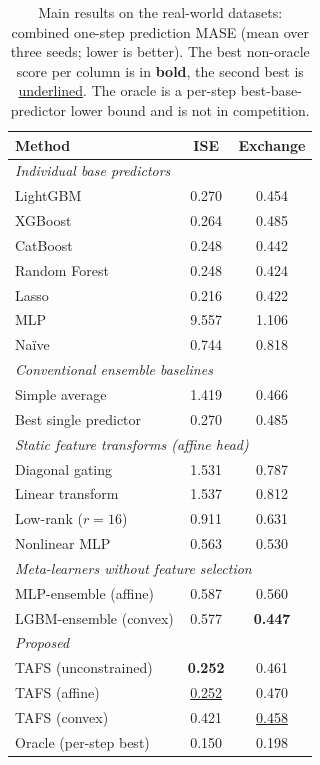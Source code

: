 \begin{table}[t]
\centering
\caption{Main results on the real-world datasets: combined one-step prediction MASE (mean over three seeds; lower is better). The best non-oracle score per column is in \textbf{bold}, the second best is \underline{underlined}. The oracle is a per-step best-base-predictor lower bound and is not in competition.}
\label{tab:main_results}
\small
\setlength{\tabcolsep}{6pt}
\begin{tabular}{lcc}
\toprule
Method & ISE & Exchange \\
\midrule
\multicolumn{3}{l}{\emph{Individual base predictors}} \\
LightGBM & 0.270 & 0.454 \\
XGBoost & 0.264 & 0.485 \\
CatBoost & 0.248 & 0.442 \\
Random Forest & 0.248 & 0.424 \\
Lasso & 0.216 & 0.422 \\
MLP & 9.557 & 1.106 \\
Na\"ive & 0.744 & 0.818 \\
\multicolumn{3}{l}{\emph{Conventional ensemble baselines}} \\
Simple average & 1.419 & 0.466 \\
Best single predictor & 0.270 & 0.485 \\
\multicolumn{3}{l}{\emph{Static feature transforms (affine head)}} \\
Diagonal gating & 1.531 & 0.787 \\
Linear transform & 1.537 & 0.812 \\
Low-rank ($r{=}16$) & 0.911 & 0.631 \\
Nonlinear MLP & 0.563 & 0.530 \\
\multicolumn{3}{l}{\emph{Meta-learners without feature selection}} \\
MLP-ensemble (affine) & 0.587 & 0.560 \\
LGBM-ensemble (convex) & 0.577 & \textbf{0.447} \\
\multicolumn{3}{l}{\emph{Proposed}} \\
TAFS (unconstrained) & \textbf{0.252} & 0.461 \\
TAFS (affine) & \underline{0.252} & 0.470 \\
TAFS (convex) & 0.421 & \underline{0.458} \\
\midrule
Oracle (per-step best) & 0.150 & 0.198 \\
\bottomrule
\end{tabular}
\end{table}
